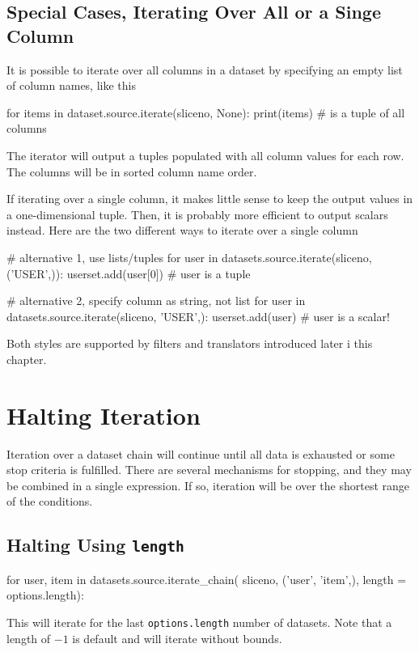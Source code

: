 \subsection*{Special Cases, Iterating Over All or a Singe Column}
It is possible to iterate over all columns in a dataset by specifying
an empty list of column names, like this
\begin{python}
for items in dataset.source.iterate(sliceno, None):
    print(items)  # is a tuple of all columns
\end{python}
The iterator will output a tuples populated with all column values for
each row.  The columns will be in sorted column name order.

If iterating over a single column, it makes little sense to keep the
output values in a one-dimensional tuple.  Then, it is probably more
efficient to output scalars instead.  Here are the two different ways
to iterate over a single column
\begin{python}
# alternative 1, use lists/tuples
for user in datasets.source.iterate(sliceno, ('USER',)):
    userset.add(user[0])  # user is a tuple

# alternative 2, specify column as string, not list
for user in datasets.source.iterate(sliceno, 'USER',):
    userset.add(user)     # user is a scalar!
\end{python}
Both styles are supported by filters and translators introduced later
i this chapter.




\section{Halting Iteration}

Iteration over a dataset chain will continue until all data is
exhausted or some stop criteria is fulfilled.  There are several
mechanisms for stopping, and they may be combined in a single
expression.  If so, iteration will be over the shortest range of the
conditions.

\subsection*{Halting Using \texttt{length}}
\begin{python}
for user, item in datasets.source.iterate_chain(
    sliceno, ('user', 'item',),
    length = options.length):
\end{python}
This will iterate for the last \texttt{options.length} number of
datasets.  Note that a length of $-1$ is default and will iterate
without bounds.


